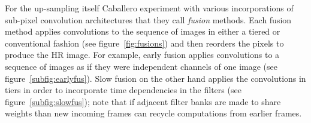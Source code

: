 
For the up-sampling itself Caballero \etal experiment with various incorporations of sub-pixel convolution architectures that they call \textit{fusion} methods.
%
Each fusion method applies convolutions to the sequence of images in either a tiered or conventional fashion (see figure~\ref{fig:fusions}) and then reorders the pixels to produce the HR image.
%
For example, early fusion applies convolutions to a sequence of images as if they were independent channels of one image (see figure~\ref{subfig:earlyfus}).
%
Slow fusion on the other hand applies the convolutions in tiers in order to incorporate time dependencies in the filters (see figure~\ref{subfig:slowfus}); note that if adjacent filter banks are made to share weights than new incoming frames can recycle computations from earlier frames.
